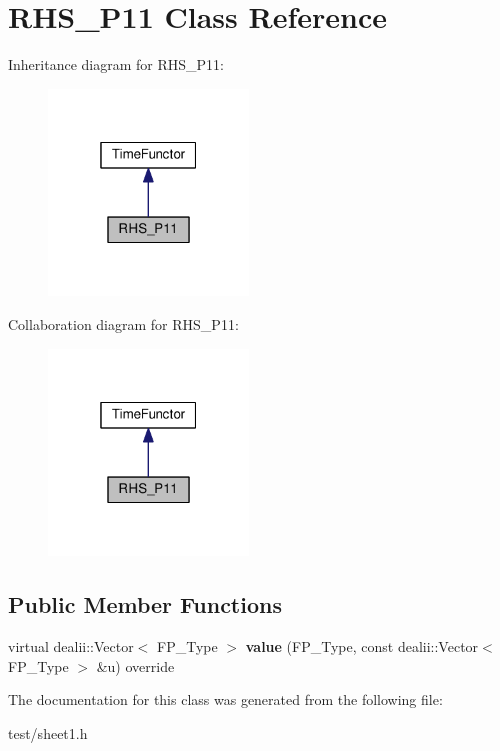 \hypertarget{classRHS__P11}{}\section{R\+H\+S\+\_\+\+P11 Class Reference}
\label{classRHS__P11}


Inheritance diagram for R\+H\+S\+\_\+\+P11\+:\nopagebreak
\begin{figure}[H]
\begin{center}
\leavevmode
\includegraphics[width=151pt]{classRHS__P11__inherit__graph}
\end{center}
\end{figure}


Collaboration diagram for R\+H\+S\+\_\+\+P11\+:\nopagebreak
\begin{figure}[H]
\begin{center}
\leavevmode
\includegraphics[width=151pt]{classRHS__P11__coll__graph}
\end{center}
\end{figure}
\subsection*{Public Member Functions}
\begin{DoxyCompactItemize}
\item 
\mbox{\label{classRHS__P11_a71c45222a289dc408299623bfb94fd80}} 
virtual dealii\+::\+Vector$<$ F\+P\+\_\+\+Type $>$ {\bfseries value} (F\+P\+\_\+\+Type, const dealii\+::\+Vector$<$ F\+P\+\_\+\+Type $>$ \&u) override
\end{DoxyCompactItemize}


The documentation for this class was generated from the following file\+:\begin{DoxyCompactItemize}
\item 
test/sheet1.\+h\end{DoxyCompactItemize}

